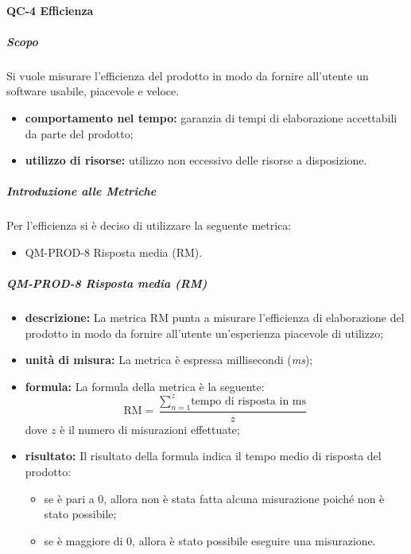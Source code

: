 		\paragraph{QC-4 Efficienza}
			\subparagraph{Scopo}
				Si vuole misurare l'efficienza del prodotto in modo da fornire all'utente un software usabile, piacevole e veloce.
				\begin{itemize}
					\item \textbf{comportamento nel tempo:} garanzia di tempi di elaborazione accettabili da parte del prodotto;
					\item \textbf{utilizzo di risorse:} utilizzo non eccessivo delle risorse a disposizione.
				\end{itemize}
			\subparagraph{Introduzione alle Metriche}
				Per l'efficienza si è deciso di utilizzare la seguente metrica:
				\begin{itemize}
					\item QM-PROD-8 Risposta media (RM).
				\end{itemize}
			\subparagraph{QM-PROD-8 Risposta media (RM)}
			\begin{itemize}
      			\item \textbf{descrizione: }
					La metrica RM punta a misurare l'efficienza di elaborazione del prodotto in modo da fornire all'utente un'esperienza piacevole di utilizzo;
				\item \textbf{unità di misura: }
					La metrica è espressa millisecondi (\textit{ms});
				\item \textbf{formula: }
					La formula della metrica è la seguente:
					\[
						\text{RM} = \frac{\sum_{n=1}^{z} \text{tempo di risposta in ms}}{z}
					\]
					dove $z$ è il numero di misurazioni effettuate;
				\item \textbf{risultato: }
					Il risultato della formula indica il tempo medio di risposta del prodotto:
					\begin{itemize}
						\item se è pari a 0, allora non è stata fatta alcuna misurazione poiché non è stato possibile;
						\item se è maggiore di 0, allora è stato possibile eseguire una misurazione.
					\end{itemize}
			\end{itemize}


